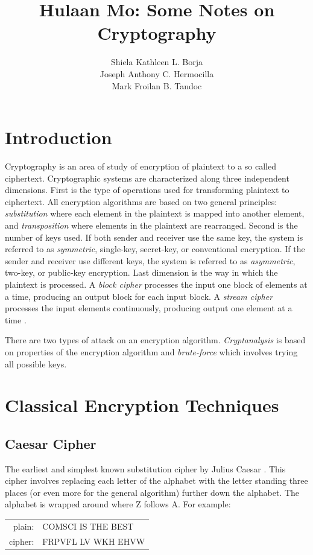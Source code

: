 \documentclass{article}
\title{Hulaan Mo: Some Notes on Cryptography}
\author{Shiela Kathleen L. Borja\\Joseph Anthony C. Hermocilla\\Mark Froilan B. Tandoc}
\date{}
\begin{document}
\maketitle

\section{Introduction}
Cryptography is an area of study of encryption of plaintext to a so called ciphertext. Cryptographic systems are characterized along three independent dimensions. First is the type of operations used for transforming plaintext to ciphertext. All encryption algorithms are based on two general principles: \textit{substitution} where each element in the plaintext is mapped into another element, and \textit{transposition} where elements in the plaintext are rearranged. Second is the number of keys used. If both sender and receiver use the same key, the system is referred to as \textit{symmetric}, single-key, secret-key, or conventional encryption. If the sender and receiver use different keys, the system is referred to as \textit{asymmetric}, two-key, or public-key encryption. Last dimension is the way in which the plaintext is processed. A \textit{block cipher} processes the input one block of elements at a time, producing an output block for each input block. A \textit{stream cipher} processes the input elements continuously, producing output one element at a time \cite{stallings2011}.

There are two types of attack on an encryption algorithm. \textit{Cryptanalysis} is based on properties of the encryption algorithm and \textit{brute-force} which involves trying all possible keys.

\section{Classical Encryption Techniques}
\subsection{Caesar Cipher}
The earliest and simplest known substitution cipher by Julius Caesar \cite{stallings2011}. This cipher involves replacing each letter of the alphabet with the letter standing three places (or even more for the general algorithm) further down the alphabet. The alphabet is wrapped around where Z follows A. For example:
\\

\begin{tabular}{r l}
	plain: & COMSCI IS THE BEST\\
	cipher: & FRPVFL LV WKH EHVW
\end{tabular}
\\
\end{document}
